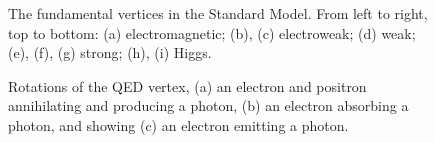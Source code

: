 \begin{figure}[htb]
    \qquad
    \caption[The fundamental vertices in the Standard Model]{
        The fundamental vertices in the Standard Model. 
        From left to right, top to bottom: 
        (a) electromagnetic; (b), (c) electroweak; (d) weak; (e), (f), (g) strong; (h), (i) Higgs. 
    }
    \label{fig:sm_vertices}
\end{figure}

\begin{figure}[htb]
    \centering
    \quad
    \quad
    \caption[Different versions of the QED vertex]{
        Rotations of the QED vertex, (a) an electron and positron annihilating and producing a photon, (b) an electron absorbing a photon, and showing (c) an electron emitting a photon.
    }
    \label{fig:qed_rotations}
\end{figure}

